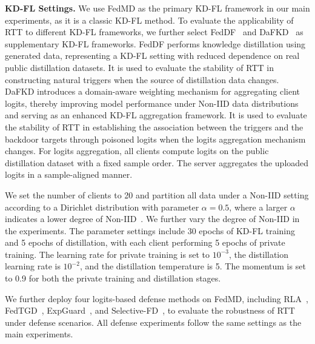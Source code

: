 \documentclass[lettersize,journal]{IEEEtran}
\begin{document}
\textbf{KD-FL Settings.} We use FedMD as the primary KD-FL framework in our main experiments, as it is a classic KD-FL method.
To evaluate the applicability of RTT to different KD-FL frameworks, we further select FedDF~\cite{Distillation_agg1} and DaFKD~\cite{Distillation_agg3} as supplementary KD-FL frameworks.
FedDF performs knowledge distillation using generated data, representing a KD-FL setting with reduced dependence on real public distillation datasets.
It is used to evaluate the stability of RTT in constructing natural triggers when the source of distillation data changes.
DaFKD introduces a domain-aware weighting mechanism for aggregating client logits, thereby improving model performance under Non-IID data distributions and serving as an enhanced KD-FL aggregation framework.
It is used to evaluate the stability of RTT in establishing the association between the triggers and the backdoor targets through poisoned logits when the logits aggregation mechanism changes.
For logits aggregation, all clients compute logits on the public distillation dataset with a fixed sample order.
The server aggregates the uploaded logits in a sample-aligned manner.

We set the number of clients to 20 and partition all data under a Non-IID setting according to a Dirichlet distribution with parameter $\alpha = 0.5$, where a larger $\alpha$ indicates a lower degree of Non-IID~\cite{NON-IID}.
We further vary the degree of Non-IID in the experiments.
The parameter settings include 30 epochs of KD-FL training and 5 epochs of distillation, with each client performing 5 epochs of private training. 
The learning rate for private training is set to $10^{-3}$, the distillation learning rate is $10^{-2}$, and the distillation temperature is 5. 
The momentum is set to 0.9 for both the private training and distillation stages.

We further deploy four logits-based defense methods on FedMD, including RLA~\cite{RLA}, FedTGD~\cite{FedTGD}, ExpGuard~\cite{ExpGuard}, and Selective-FD~\cite{agg}, to evaluate the robustness of RTT under defense scenarios.
All defense experiments follow the same settings as the main experiments.
\end{document}
